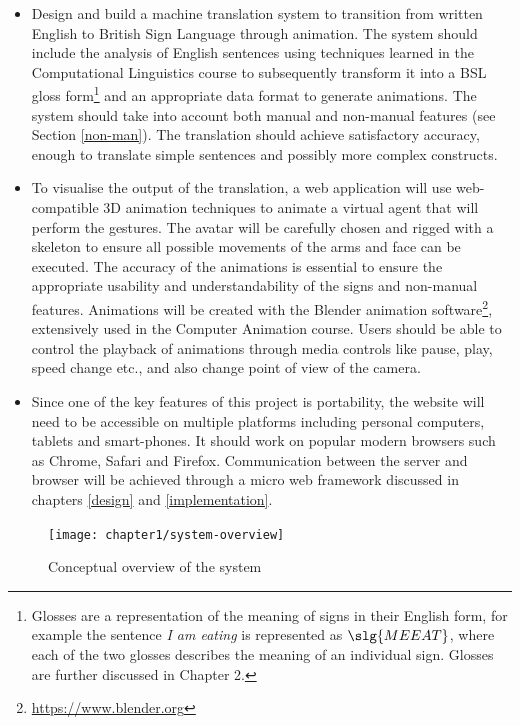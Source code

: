 \documentclass[12pt]{ociamthesis}  %
\begin{document}
\begin{itemize}
	\item Design and build a machine translation system to transition from written English to British Sign Language through animation. The system should include the analysis of English sentences using techniques learned in the Computational Linguistics course to subsequently transform it into a BSL gloss form\footnote{Glosses are a representation of the meaning of signs in their English form, for example the sentence \textit{I am eating} is represented as $\slg{ME EAT}$, where each of the two glosses describes the meaning of an individual sign. Glosses are further discussed in Chapter 2.} and an appropriate data format to generate animations. The system should take into account both manual and non-manual features (see Section \ref{non-man}). The translation should achieve satisfactory accuracy, enough to translate simple sentences and possibly more complex constructs.
 	\item To visualise the output of the translation, a web application will use web-compatible 3D animation techniques to animate a virtual agent that will perform the gestures. The avatar will be carefully chosen and rigged with a skeleton to ensure all possible movements of the arms and face can be executed. The accuracy of the animations is essential to ensure the appropriate usability and understandability of the signs and non-manual features. Animations will be created  with the Blender animation software\footnote{\url{https://www.blender.org}}, extensively used in the Computer Animation course. Users should be able to control the playback of animations through media controls like pause, play, speed change etc., and also change point of view of the camera.
	\item Since one of the key features of this project is portability, the website will need to be accessible on multiple platforms including personal computers, tablets and smart-phones. It should work on popular modern browsers such as Chrome, Safari and Firefox. Communication between the server and browser will be achieved through a micro web framework discussed in chapters \ref{design} and \ref{implementation}.
\end{itemize}

\begin{figure}[H]
	\centering
    \texttt{[image: chapter1/system-overview]}
    \caption{Conceptual overview of the system}
    \label{fig:sys-overview}
\end{figure}
\end{document}
